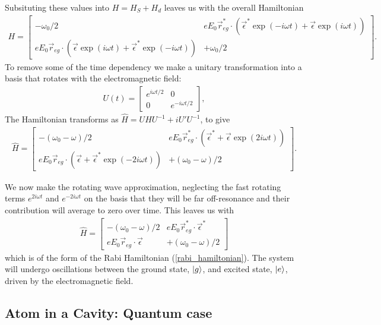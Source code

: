 Subsituting these values into $H = H_S + H_d$ leaves us with the overall Hamiltonian
\begin{align}
  H =
  \begin{bmatrix}
    -\omega_0/2 & eE_0\vec{r}_{eg}^*\cdot(\vec{\epsilon}^*\exp(-i\omega t) + \vec{\epsilon}\exp(i\omega t)) \\
    eE_0\vec{r}_{eg}\cdot(\vec{\epsilon}\exp(i\omega t) + \vec{\epsilon}^*\exp(-i\omega t)) & +\omega_0/2
  \end{bmatrix}.
\end{align}
To remove some of the time dependency we make a unitary transformation into a basis that rotates with the electromagnetic field:
\begin{align}
  U(t) =
  \begin{bmatrix}
    e^{i\omega t/2} & 0 \\
    0 & e^{-i\omega t/2}
  \end{bmatrix},
\end{align}
The Hamiltonian transforms as $\hat{H} = UHU^{-1} + i U'U^{-1}$, to give
\begin{align}
  \hat{H} =
  \begin{bmatrix}
    -(\omega_0-\omega)/2 & eE_0\vec{r}_{eg}^*\cdot(\vec{\epsilon}^* + \vec{\epsilon}\exp(2i\omega t)) \\
    eE_0\vec{r}_{eg}\cdot(\vec{\epsilon} + \vec{\epsilon}^*\exp(-2i\omega t)) & +(\omega_0-\omega)/2
  \end{bmatrix}.
\end{align}

We now make the rotating wave approximation, neglecting the fast rotating terms $e^{2i\omega t}$ and $e^{-2i\omega t}$ on the basis that they will be far off-resonance and their contribution will average to zero over time. This leaves us with 
\begin{align}
  \hat{H} =
  \begin{bmatrix}
    -(\omega_0-\omega)/2 & eE_0\vec{r}_{eg}^*\cdot\vec{\epsilon}^* \\
    eE_0\vec{r}_{eg}\cdot\vec{\epsilon} & +(\omega_0-\omega)/2
  \end{bmatrix}
\end{align}
which is of the form of the Rabi Hamiltonian (\ref{rabi_hamiltonian}). The system will undergo oscillations between the ground state, $\left\vert g\right\rangle$, and excited state, $\left\vert e\right\rangle$, driven by the electromagnetic field.

\subsection{Atom in a Cavity: Quantum case}\label{JC_Ham}

